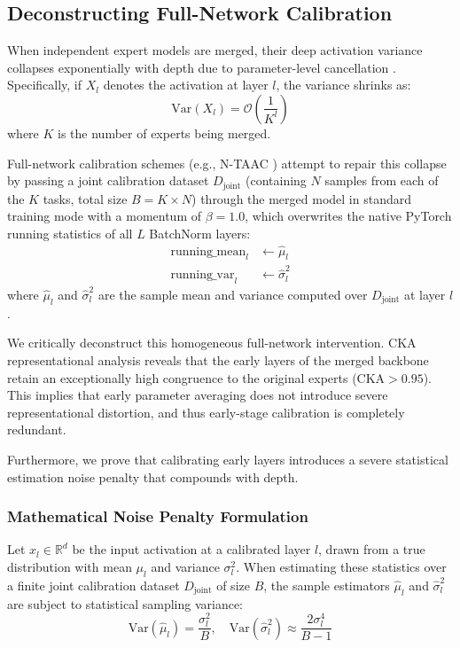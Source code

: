 \documentclass{article}
\theoremstyle{plain}
\theoremstyle{definition}
\begin{document}
\subsection{Deconstructing Full-Network Calibration}
When independent expert models are merged, their deep activation variance collapses exponentially with depth due to parameter-level cancellation \cite{jordan2022repair}. Specifically, if $X_l$ denotes the activation at layer $l$, the variance shrinks as:
\begin{equation}
    \text{Var}(X_l) = \mathcal{O}\left( \frac{1}{K^l} \right)
\end{equation}
where $K$ is the number of experts being merged.

Full-network calibration schemes (e.g., N-TAAC \cite{submission3}) attempt to repair this collapse by passing a joint calibration dataset $D_{\text{joint}}$ (containing $N$ samples from each of the $K$ tasks, total size $B = K \times N$) through the merged model in standard training mode with a momentum of $\beta=1.0$, which overwrites the native PyTorch running statistics of all $L$ BatchNorm layers:
\begin{align}
    \text{running\_mean}_l &\leftarrow \hat{\mu}_l \\
    \text{running\_var}_l &\leftarrow \hat{\sigma}^2_l
\end{align}
where $\hat{\mu}_l$ and $\hat{\sigma}^2_l$ are the sample mean and variance computed over $D_{\text{joint}}$ at layer $l$.

We critically deconstruct this homogeneous full-network intervention. CKA representational analysis reveals that the early layers of the merged backbone retain an exceptionally high congruence to the original experts ($\text{CKA} > 0.95$). This implies that early parameter averaging does not introduce severe representational distortion, and thus early-stage calibration is completely redundant.

Furthermore, we prove that calibrating early layers introduces a severe statistical estimation noise penalty that compounds with depth.

\subsubsection{Mathematical Noise Penalty Formulation}
Let $x_l \in \mathbb{R}^d$ be the input activation at a calibrated layer $l$, drawn from a true distribution with mean $\mu_l$ and variance $\sigma^2_l$. When estimating these statistics over a finite joint calibration dataset $D_{\text{joint}}$ of size $B$, the sample estimators $\hat{\mu}_l$ and $\hat{\sigma}^2_l$ are subject to statistical sampling variance:
\begin{equation}
    \text{Var}(\hat{\mu}_l) = \frac{\sigma^2_l}{B}, \quad \text{Var}(\hat{\sigma}^2_l) \approx \frac{2\sigma^4_l}{B-1}
\end{equation}
\end{document}
